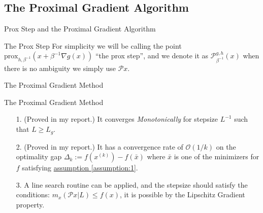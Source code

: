\documentclass[11pt]{beamer}
\begin{document}
    \subsection{The Proximal Gradient Algorithm}
        \begin{frame}{Prox Step and the Proximal Gradient Algorithm}
            \begin{block}{The Prox Step}
                For simplicity we will be calling the point $\text{prox}_{h, \beta^{-1}}(x + \beta^{-1}\nabla g(x))$ ``the prox step'', and we denote it as $\mathcal P_{\beta^{-1}}^{g, h}(x)$ when there is no ambiguity we simply use $\mathcal Px$.     
            \end{block}
            \begin{block}{The Proximal Gradient Method}
                \begin{algorithm}[H]
                    \scriptsize
                    \begin{algorithmic}[1]
                        \ENDIF
                    \ENDFOR
                    \end{algorithmic}
                    \caption{Proximal Gradient With Fixed Step-sizes}
                    \label{alg:1}
                \end{algorithm}
            \end{block}
        \end{frame}
        \begin{frame}{The Proximal Gradient Method}
            \begin{itemize}
                \item [1.] (Proved in my report.) It converges \emph{Monotonically} for stepsize $L^{-1}$ such that $L \ge L_g$. 
                \pause \item [2.] (Proved in my report.) It has a convergence rate of $\mathcal O(1/k)$ on the optimality gap $\Delta_k := f(x^{(k)}) - f(\bar x)$ where $\bar x$ is one of the minimizers for $f$ satisfying \hyperref[assumption:1]{assumption \ref*{assumption:1}}. 
                \pause \item [3.] A line search routine can be applied, and the stepsize should satisfy the conditions: $m_x(\mathcal Px|L)\le f(x)$, it is possible by the Lipschitz Gradient property. 
            \end{itemize}
        \end{frame}
        
\end{document}

